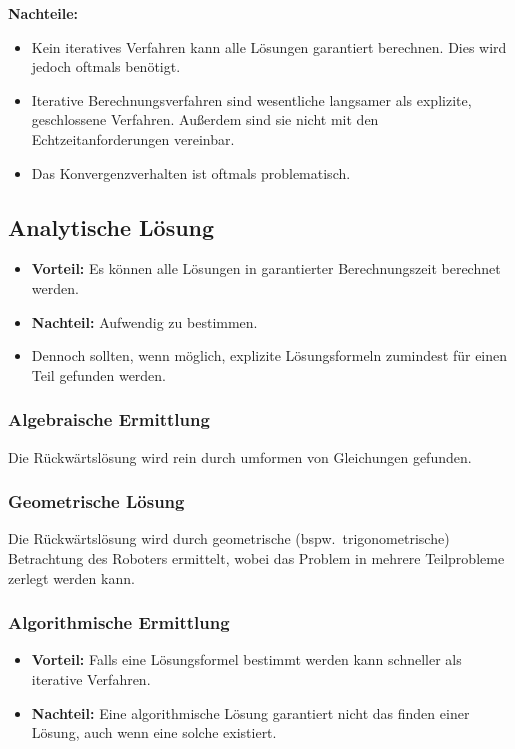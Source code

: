 \documentclass[a4paper, 11pt, accentcolor = tud3b]{tudreport}
\newcommand{\bspw}{bspw.~}
\begin{document}
				\textbf{Nachteile:}
				\begin{itemize}
					\item Kein iteratives Verfahren kann alle Lösungen garantiert berechnen. Dies wird jedoch oftmals benötigt.
					\item Iterative Berechnungsverfahren sind wesentliche langsamer als explizite, geschlossene Verfahren. Außerdem sind sie nicht mit den Echtzeitanforderungen vereinbar.
					\item Das Konvergenzverhalten ist oftmals problematisch.
				\end{itemize}

			\subsection{Analytische Lösung}
				\begin{itemize}
					\item \textbf{Vorteil:} Es können alle Lösungen in garantierter Berechnungszeit berechnet werden.
					\item \textbf{Nachteil:} Aufwendig zu bestimmen.
					\item Dennoch sollten, wenn möglich, explizite Lösungsformeln zumindest für einen Teil gefunden werden.
				\end{itemize}
			
				\subsubsection{Algebraische Ermittlung}
					Die Rückwärtslösung wird rein durch umformen von Gleichungen gefunden.
				
				\subsubsection{Geometrische Lösung}
					Die Rückwärtslösung wird durch geometrische (\bspw trigonometrische) Betrachtung des Roboters ermittelt, wobei das Problem in mehrere Teilprobleme zerlegt werden kann.
				
				\subsubsection{Algorithmische Ermittlung}
					\begin{itemize}
						\item \textbf{Vorteil:} Falls eine Lösungsformel bestimmt werden kann schneller als iterative Verfahren.
						\item \textbf{Nachteil:} Eine algorithmische Lösung garantiert nicht das finden einer Lösung, auch wenn eine solche existiert.
					\end{itemize}
\end{document}
